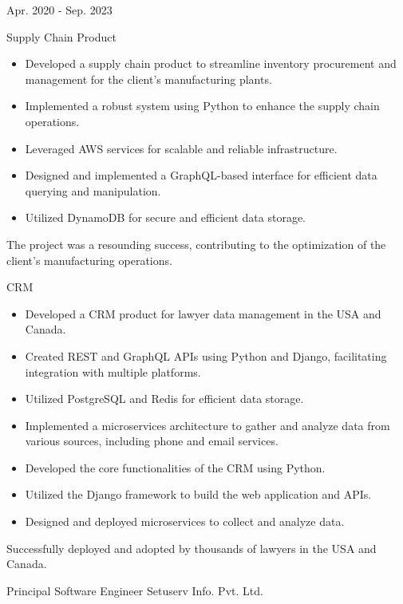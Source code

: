 \begin{cventries}
    {Apr. 2020 - Sep. 2023} %
    {
      \begin{cvitems} %
        \item {Supply Chain Product}
        \begin {itemize}
          \item Developed a supply chain product to streamline inventory procurement and management for the client's manufacturing plants.
          \item Implemented a robust system using Python to enhance the supply chain operations.
          \item Leveraged AWS services for scalable and reliable infrastructure.
          \item Designed and implemented a GraphQL-based interface for efficient data querying and manipulation.
          \item Utilized DynamoDB for secure and efficient data storage.
          \end{itemize}
        The project was a resounding success, contributing to the optimization of the client's manufacturing operations.
	\item {CRM}
      \begin {itemize}
        \item Developed a CRM product for lawyer data management in the USA and Canada.
        \item Created REST and GraphQL APIs using Python and Django, facilitating integration with multiple platforms.
        \item Utilized PostgreSQL and Redis for efficient data storage.
        \item Implemented a microservices architecture to gather and analyze data from various sources, including phone and email services.
        \item Developed the core functionalities of the CRM using Python.
        \item Utilized the Django framework to build the web application and APIs.
        \item Designed and deployed microservices to collect and analyze data.
      \end{itemize}
        Successfully deployed and adopted by thousands of lawyers in the USA and Canada.
      \end{cvitems}
    }
  \cventry
    {Principal Software Engineer} %
    {Setuserv Info. Pvt. Ltd.} %

\end{cventries}
